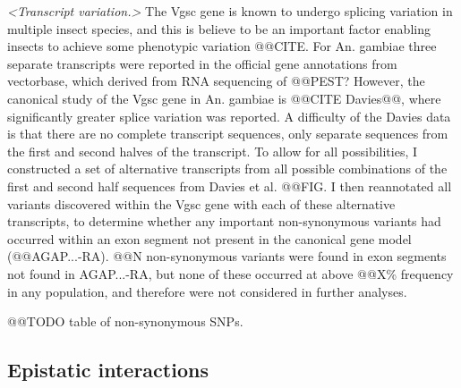 \documentclass[a4paper,11pt,abstracton,hidelinks]{scrartcl}
\begin{document}
{\begin{landscape}
\begin{table}[h]
\begin{threeparttable}
\begin{tablenotes}
  \end{tablenotes}

  \end{threeparttable}

\end{table}
\end{landscape}
\restoregeometry
} %


\textit{<Transcript variation.>}
%
The Vgsc gene is known to undergo splicing variation in multiple insect species, and this is believe to be an important factor enabling insects to achieve some phenotypic variation @@CITE.
%
For An. gambiae three separate transcripts were reported in the official gene annotations from vectorbase, which derived from RNA sequencing of @@PEST?
%
However, the canonical study of the Vgsc gene in An. gambiae is @@CITE Davies@@, where significantly greater splice variation was reported.
%
A difficulty of the Davies data is that there are no complete transcript sequences, only separate sequences from the first and second halves of the transcript.
%
To allow for all possibilities, I constructed a set of alternative transcripts from all possible combinations of the first and second half sequences from Davies et al. @@FIG.
%
I then reannotated all variants discovered within the Vgsc gene with each of these alternative transcripts, to determine whether any important non-synonymous variants had occurred within an exon segment not present in the canonical gene model (@@AGAP...-RA).
%
@@N non-synonymous variants were found in exon segments not found in AGAP...-RA, but none of these occurred at above @@X\% frequency in any population, and therefore were not considered in further analyses.


@@TODO table of non-synonymous SNPs.


\subsection*{Epistatic interactions}
\end{document}
